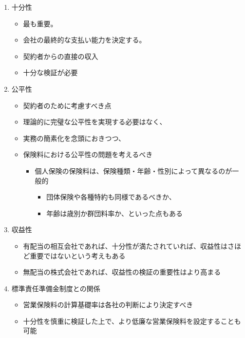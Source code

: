\documentclass[
]{article}
\providecommand{\tightlist}{%
  \setlength{\itemsep}{0pt}\setlength{\parskip}{0pt}}
\begin{document}
\begin{enumerate}
\def\labelenumi{\arabic{enumi}.}
\tightlist
\item
  十分性

  \begin{itemize}
  \tightlist
  \item
    最も重要。
  \item
    会社の最終的な支払い能力を決定する。
  \item
    契約者からの直接の収入
  \item
    十分な検証が必要
  \end{itemize}
\item
  公平性

  \begin{itemize}
  \tightlist
  \item
    契約者のために考慮すべき点
  \item
    理論的に完璧な公平性を実現する必要はなく、
  \item
    実務の簡素化を念頭におきつつ、
  \item
    保険料における公平性の問題を考えるべき

    \begin{itemize}
    \tightlist
    \item
      個人保険の保険料は、保険種類・年齢・性別によって異なるのが一般的

      \begin{itemize}
      \tightlist
      \item
        団体保険や各種特約も同様であるべきか、
      \item
        年齢は歳別か群団料率か、といった点もある
      \end{itemize}
    \end{itemize}
  \end{itemize}
\item
  収益性

  \begin{itemize}
  \tightlist
  \item
    有配当の相互会社であれば、十分性が満たされていれば、収益性はさほど重要ではないという考えもある
  \item
    無配当の株式会社であれば、収益性の検証の重要性はより高まる
  \end{itemize}
\item
  標準責任準備金制度との関係

  \begin{itemize}
  \tightlist
  \item
    営業保険料の計算基礎率は各社の判断により決定すべき
  \item
    十分性を慎重に検証した上で、より低廉な営業保険料を設定することも可能


\end{itemize}
\end{enumerate}
\end{document}
